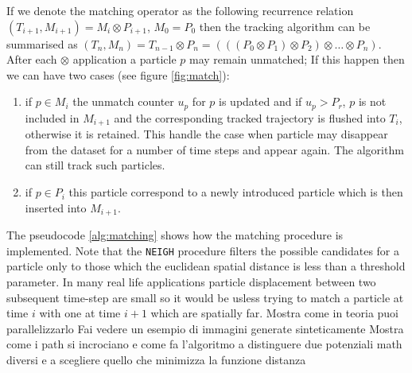 \documentclass[conference]{IEEEtran}
\begin{document}
If we denote the matching operator  as the following recurrence relation $(T_{i+1},M_{i+1}) = M_i \otimes P_{i+1} $, $M_0=P_0$ then the  tracking algorithm can be summarised as $(T_n,M_n) = T_{n-1} \otimes P_{n}=(((P_0 \otimes P_1)\otimes P_2) \otimes \ldots \otimes P_n)$.
After each $\otimes$ application a particle $p$ may remain  unmatched; If this happen then we can have two cases (see figure \ref{fig:match}):
\begin{enumerate}
 \item if $p \in M_{i}$ the unmatch counter $u_p$ for $p$ is updated and if $u_p > P_r$, $p$ is not included in $M_{i+1}$ and the corresponding tracked trajectory is flushed into $T_i$, otherwise it is retained. This handle the case when particle may disappear from the dataset for a number of time steps and  appear again. The algorithm can still track such particles.
 \item if $p \in P_i$ this particle correspond to a newly introduced particle which is then inserted into $M_{i+1}$. 
\end{enumerate}
 
The pseudocode \ref{alg:matching} shows how the matching procedure is implemented. Note that the \texttt{NEIGH} procedure filters the possible candidates for a particle only to those which the euclidean spatial distance is less than a threshold parameter. In many real life applications particle displacement between two subsequent time-step are small so it would be usless trying to match a particle at time $i$ with one at time $i+1$ which are spatially far.
Mostra come in teoria puoi parallelizzarlo
Fai vedere un esempio di immagini generate sinteticamente
Mostra come i path si incrociano e come fa l'algoritmo a distinguere due potenziali math diversi e a scegliere quello che minimizza la funzione distanza
\end{document}
